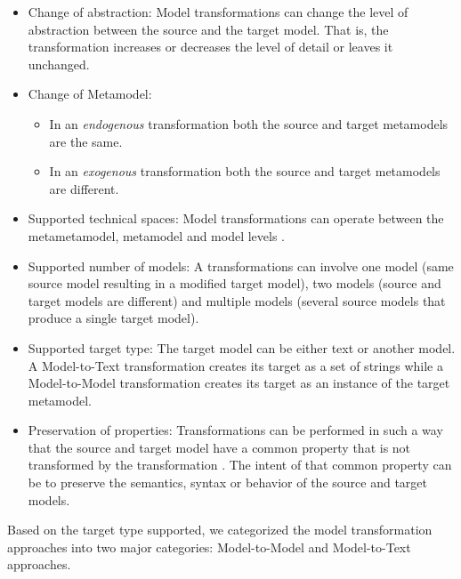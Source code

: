 \begin{itemize}

\item Change of abstraction: Model transformations can change the level of abstraction between the source and the target model. That is, the transformation increases or decreases the level of detail or leaves it unchanged.

\item Change of Metamodel: 
	\begin{itemize}
		\item In an \textit{endogenous} \cite{Visser2005} transformation both the source and target metamodels are 			the same.
		\item In an \textit{exogenous} \cite{Visser2005} transformation both the source and target metamodels are 			different.
	\end{itemize}
\item Supported technical spaces: Model transformations can operate between the metametamodel, metamodel and model levels \cite{OOPSLA2004Bezivin}. 

\item Supported number of models: A transformations can involve one model (same source model resulting in a modified target model), two models (source and target models are different) and multiple models (several source models that produce a single target model).

\item Supported target type: The target model can be either text or another model. A Model-to-Text transformation creates its target as a set of strings while a  Model-to-Model transformation creates its target as an instance of the target metamodel.

\item Preservation of properties: Transformations can be performed in such a way that the source and target model have a common property that is not transformed by the transformation \cite{biehl2010literature}. The intent of that common property can be to preserve the semantics, syntax or behavior of the source and target models. 
\end{itemize}

Based on the target type supported, we categorized the model transformation approaches into two major categories\cite{Czarnecki2006}: Model-to-Model and Model-to-Text approaches. 

